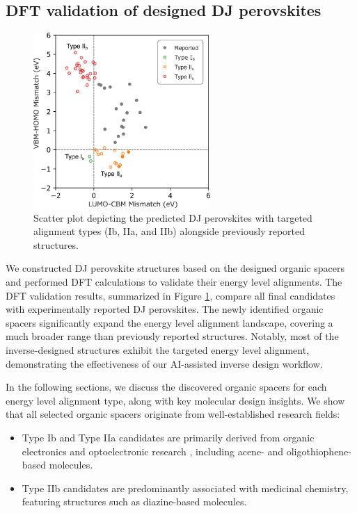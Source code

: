 \subsection{DFT validation of designed DJ perovskites}

\begin{figure}[htbp]
    \centering
    \includegraphics[width=0.6\textwidth]{figures/synthesis-feasibility/figure5-20.png}
    \caption{Scatter plot depicting the predicted DJ perovskites with targeted alignment types (Ib, IIa, and IIb) alongside previously reported structures.}
    \label{fig:figure5.20}
\end{figure}

We constructed DJ perovskite structures based on the designed organic spacers and performed DFT calculations to validate their energy level alignments. The DFT validation results, summarized in Figure \ref{fig:figure5.20}, compare all final candidates with experimentally reported DJ perovskites. The newly identified organic spacers significantly expand the energy level alignment landscape, covering a much broader range than previously reported structures. Notably, most of the inverse-designed structures exhibit the targeted energy level alignment, demonstrating the effectiveness of our AI-assisted inverse design workflow.

In the following sections, we discuss the discovered organic spacers for each energy level alignment type, along with key molecular design insights. We show that all selected organic spacers originate from well-established research fields:
\begin{itemize}
    \item Type Ib and Type IIa candidates are primarily derived from organic electronics and optoelectronic research \cite{RN628, RN632}, including acene- and oligothiophene-based molecules.
    \item Type IIb candidates are predominantly associated with medicinal chemistry, featuring structures such as diazine-based molecules.
\end{itemize}


